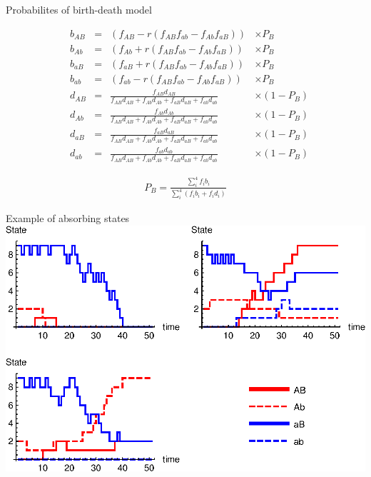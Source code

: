 \documentclass{beamer}
\begin{document}
\begin{frame}{Probabilites of birth-death model}

    \begin{equation*}
    \begin{aligned}
        &b_{AB} & =& (f_{AB}-r(f_{AB}f_{ab}-f_{Ab}f_{aB})) & \times P_B\\
        &b_{Ab} & =& (f_{Ab}+r(f_{AB}f_{ab}-f_{Ab}f_{aB})) & \times P_B\\
        &b_{aB} & =& (f_{aB}+r(f_{AB}f_{ab}-f_{Ab}f_{aB})) & \times P_B\\
        &b_{ab} & =& (f_{ab}-r(f_{AB}f_{ab}-f_{Ab}f_{aB})) & \times P_B\\
        &d_{AB} & =& \frac{f_{AB}d_{AB}}{f_{AB} d_{AB}+f_{Ab}d_{Ab}+f_{aB}d_{aB}+f_{ab}d_{ab}} & \times (1-P_B) \\
        &d_{Ab} & =& \frac{f_{Ab}d_{Ab}}{f_{AB} d_{AB}+f_{Ab}d_{Ab}+f_{aB}d_{aB}+f_{ab}d_{ab}} & \times (1-P_B) \\
        &d_{aB} & =& \frac{f_{aB}d_{aB}}{f_{AB} d_{AB}+f_{Ab}d_{Ab}+f_{aB}d_{aB}+f_{ab}d_{ab}} & \times (1-P_B) \\
        &d_{ab} & =& \frac{f_{ab}d_{ab}}{f_{AB} d_{AB}+f_{Ab}d_{Ab}+f_{aB}d_{aB}+f_{ab}d_{ab}} & \times (1-P_B) 
    \end{aligned}
    \end{equation*} 
    
    \begin{equation*}
    \begin{aligned}
        P_B = \frac{\sum_i^4 f_i b_i}{\sum_i^4 (f_i b_i + f_i d_i)}
    \end{aligned}
    \end{equation*}
  
    
\end{frame}

\begin{frame}{Example of absorbing states}
    \includegraphics[width=1.0\textwidth]{Matlab/data/gridplot.eps}
\end{frame}
\end{document}
